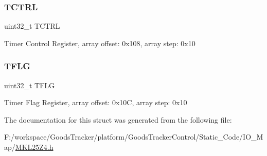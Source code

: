 \mbox{\label{struct_p_i_t___mem_map_a08ca8a896322049f4b82825f4b0ba6ee}} 
\subsubsection{\texorpdfstring{T\+C\+T\+RL}{TCTRL}}
{\footnotesize\ttfamily uint32\+\_\+t T\+C\+T\+RL}

Timer Control Register, array offset\+: 0x108, array step\+: 0x10 \mbox{\label{struct_p_i_t___mem_map_a99ca085350eab8581351ff32448cde09}} 
\subsubsection{\texorpdfstring{T\+F\+LG}{TFLG}}
{\footnotesize\ttfamily uint32\+\_\+t T\+F\+LG}

Timer Flag Register, array offset\+: 0x10C, array step\+: 0x10 

The documentation for this struct was generated from the following file\+:\begin{DoxyCompactItemize}
\item 
F\+:/workspace/\+Goods\+Tracker/platform/\+Goods\+Tracker\+Control/\+Static\+\_\+\+Code/\+I\+O\+\_\+\+Map/\hyperlink{_m_k_l25_z4_8h}{M\+K\+L25\+Z4.\+h}\end{DoxyCompactItemize}
